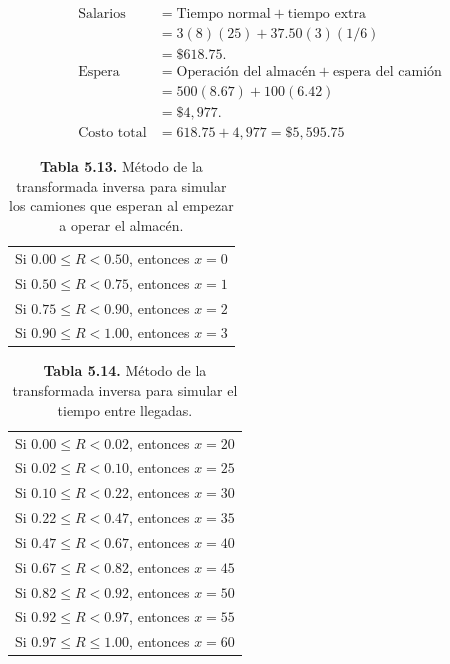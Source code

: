 \documentclass[11pt,letterpaper]{report}
\begin{document}
\begin{align*}
\text{Salarios} &= \text{Tiempo normal} + \text{tiempo extra} \\
&= 3(8)(25) + 37.50(3)(1/6) \\
&= \$618.75. \\[6pt]
\text{Espera} &= \text{Operación del almacén} + \text{espera del camión} \\
&= 500(8.67) + 100(6.42) \\
&= \$4{,}977. \\[6pt]
\text{Costo total} &= 618.75 + 4{,}977 = \$5{,}595.75
\end{align*}

\begin{table}[H]
\centering
\caption*{\textbf{Tabla 5.13.} Método de la transformada inversa para simular los camiones que esperan al empezar a operar el almacén.}
\begin{tabular}{l}
Si $0.00 \le R < 0.50$, entonces $x=0$ \\
Si $0.50 \le R < 0.75$, entonces $x=1$ \\
Si $0.75 \le R < 0.90$, entonces $x=2$ \\
Si $0.90 \le R < 1.00$, entonces $x=3$ \\
\end{tabular}
\end{table}

\begin{table}[H]
\centering
\caption*{\textbf{Tabla 5.14.} Método de la transformada inversa para simular el tiempo entre llegadas.}
\begin{tabular}{l}
Si $0.00 \le R < 0.02$, entonces $x=20$ \\
Si $0.02 \le R < 0.10$, entonces $x=25$ \\
Si $0.10 \le R < 0.22$, entonces $x=30$ \\
Si $0.22 \le R < 0.47$, entonces $x=35$ \\
Si $0.47 \le R < 0.67$, entonces $x=40$ \\
Si $0.67 \le R < 0.82$, entonces $x=45$ \\
Si $0.82 \le R < 0.92$, entonces $x=50$ \\
Si $0.92 \le R < 0.97$, entonces $x=55$ \\
Si $0.97 \le R \le 1.00$, entonces $x=60$ \\
\end{tabular}
\end{table}
\end{document}
